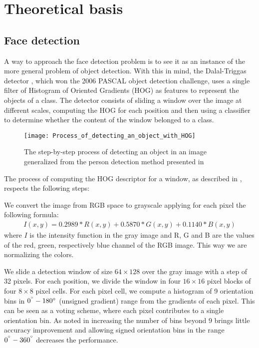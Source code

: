 \chapter{Theoretical basis}

\section{Face detection}
A way to approach the face detection problem is to see it as an instance of the more general problem of object detection. With this in mind, the Dalal-Triggas detector \cite{DalalTriggs05}, which won the 2006 PASCAL object detection challenge, uses a single filter of Histogram of Oriented Gradients (HOG) as features to represent the objects of a class. The detector consists of sliding a window over the image at different scales, computing the HOG for each position and then using a classifier to determine whether the content of the window belonged to a class.
\begin{figure}[h]
	\begin{center}
		\texttt{[image: Process\_of\_detecting\_an\_object\_with\_HOG]}
		\caption[Process flow of detecting an object in an image]{The step-by-step process of detecting an object in an image generalized from the person detection method presented in \cite{DalalTriggs05}}
	\end{center}
\end{figure}
The process of computing the HOG descriptor for a window, as described in \cite{DalalTriggs05}, respects the following steps: 

We convert the image from RGB space to grayscale applying for each pixel the following formula: 
\begin{align}
	I(x,y) = 0.2989 * R(x,y) + 0.5870 * G(x,y) + 0.1140 * B(x,y)
	\label{formula:intensity_function}
\end{align}
where $I$ is the intensity function in the gray image and R, G and B are the values of the red, green, respectively blue channel of the RGB image. This way we are normalizing the colors.
	 
We slide a detection window of size $64\times128$ over the gray image with a step of 32 pixels. For each position, we divide the window in four $16\times16$ pixel blocks of four $8\times8$ pixel cells. For each pixel cell, we compute a histogram of 9 orientation bins in $0^{\degree}-180{\degree}$ (unsigned gradient) range from the gradients of each pixel. This can be seen as a voting scheme, where each pixel contributes to a single orientation bin. As noted in \cite{DalalTriggs05} increasing the number of bins beyond 9 brings little accuracy improvement and allowing signed orientation bins in the range $0^{\degree}-360^{\degree}$ decreases the performance.

